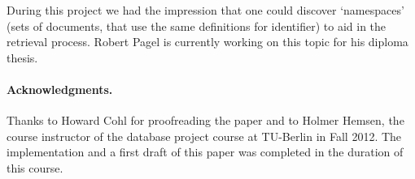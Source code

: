 \documentclass[runningheads]{llncs}
\begin{document}
During this project we had the impression that one could discover `namespaces'
(sets of documents, that use the same definitions for identifier) to aid in
the retrieval process. Robert Pagel is currently working on this topic
for his diploma thesis.


\paragraph*{Acknowledgments.}

Thanks to Howard Cohl for proofreading the paper and to Holmer Hemsen, the
course instructor of the database project course at TU-Berlin in Fall 2012.
The implementation and a first draft of this paper was completed in the
duration of this course.


\begingroup
\let\clearpage\relax

\endgroup
\end{document}
